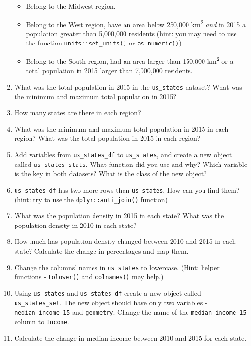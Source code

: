 \documentclass[]{krantz}
\providecommand{\tightlist}{%
  \setlength{\itemsep}{0pt}\setlength{\parskip}{0pt}}
\begin{document}
\begin{enumerate}
  \begin{itemize}
  \tightlist
  \item
    Belong to the Midwest region.
  \item
    Belong to the West region, have an area below 250,000 km\textsuperscript{2} \emph{and} in 2015 a population greater than 5,000,000 residents (hint: you may need to use the function \texttt{units::set\_units()} or \texttt{as.numeric()}).
  \item
    Belong to the South region, had an area larger than 150,000 km\textsuperscript{2} or a total population in 2015 larger than 7,000,000 residents.
  \end{itemize}
\item
  What was the total population in 2015 in the \texttt{us\_states} dataset?
  What was the minimum and maximum total population in 2015?
\item
  How many states are there in each region?
\item
  What was the minimum and maximum total population in 2015 in each region?
  What was the total population in 2015 in each region?
\item
  Add variables from \texttt{us\_states\_df} to \texttt{us\_states}, and create a new object called \texttt{us\_states\_stats}.
  What function did you use and why?
  Which variable is the key in both datasets?
  What is the class of the new object?
\item
  \texttt{us\_states\_df} has two more rows than \texttt{us\_states}.
  How can you find them? (hint: try to use the \texttt{dplyr::anti\_join()} function)
\item
  What was the population density in 2015 in each state?
  What was the population density in 2010 in each state?
\item
  How much has population density changed between 2010 and 2015 in each state?
  Calculate the change in percentages and map them.
\item
  Change the columns' names in \texttt{us\_states} to lowercase. (Hint: helper functions - \texttt{tolower()} and \texttt{colnames()} may help.)
\item
  Using \texttt{us\_states} and \texttt{us\_states\_df} create a new object called \texttt{us\_states\_sel}.
  The new object should have only two variables - \texttt{median\_income\_15} and \texttt{geometry}.
  Change the name of the \texttt{median\_income\_15} column to \texttt{Income}.
\item
  Calculate the change in median income between 2010 and 2015 for each state.

\end{enumerate}
\end{document}
